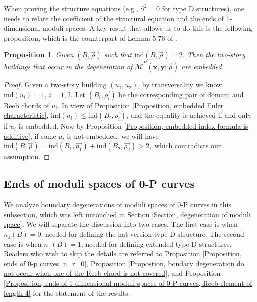 \documentclass{amsart}
\newtheorem{prop}[thm]{Proposition}
\theoremstyle{definition}
\theoremstyle{remark}
\numberwithin{equation}{section}
\numberwithin{equation}{section} \makeatletter
\begin{document}
 When proving the structure equations (e.g., $\partial^2=0$ for type D structures), one needs to relate the coefficient of the structural equation and the ends of 1-dimensional moduli spaces. A key result that allows us to do this is the following proposition, which is the counterpart of Lemma 5.76 of \cite{LOT18}. 

\begin{prop}\label{Proposition, levels of degeneration are embedded}
Given $(B,\overrightarrow{\rho})$ such that $\text{ind}(B,\overrightarrow{\rho})=2$. Then the two-story buildings that occur in the degeneration of $\overline{\mathcal{M}}^B(\bm{x},\bm{y};\overrightarrow{\rho})$ are embedded.  
\end{prop}
\begin{proof}
Given a two-story building $(u_1,u_2)$, by transversality we know $\text{ind}(u_i)=1$, $i=1,2$. Let $(B_i,\overrightarrow{\rho_i})$ be the corresponding pair of domain and Reeb chords of $u_i$. In view of Proposition \ref{Proposition, embedded Euler characteristic}, $\text{ind}(u_i)\leq \text{ind}(B_i,\overrightarrow{\rho_i})$, and the equality is achieved if and only if $u_i$ is embedded. Now by Proposition \ref{Proposition, embedded index formula is additive}, if some $u_i$ is not embedded, we will have $\text{ind}(B,\overrightarrow{\rho})=\text{ind}(B_1,\overrightarrow{\rho_1})+\text{ind}(B_2,\overrightarrow{\rho_2})>2,$ which contradicts our assumption.
\end{proof}



\subsection{Ends of moduli spaces of 0-P curves}\label{Section, ends of moduli spaces of 0-p curves}
We analyze boundary degenerations of moduli spaces of 0-P curves in this subsection, which was left untouched in Section \ref{Section, degeneration of moduli space}. We will separate the discussion into two cases. The first case is when $n_z(B)=0$, needed for defining the hat-version type D structure. The second case is when $n_z(B)=1$, needed for defining extended type D structures. Readers who wish to skip the details are referred to Proposition \ref{Proposition, ends of 0-p curves, n_z=0}, Proposition \ref{Propostion, bondary degeneration do not occur when one of the Reeb chord is not covered}, and Proposition \ref{Proposition, ends of 1-dimensional moduli spaces of 0-P curves, Reeb element of length 4} for the statement of the results. 
\end{document}
